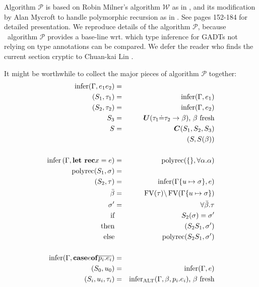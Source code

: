 \documentclass{article}
\newcommand{\tmmathbf}[1]{\ensuremath{\boldsymbol{#1}}}
\newcommand{\tmop}[1]{\ensuremath{\operatorname{#1}}}
\newcommand{\tmstrong}[1]{\textbf{#1}}
\begin{document}
Algorithm $\mathcal{P}$ is based on Robin Milner's algorithm $\mathcal{W}$ as
in {\cite{Milner78}}, and its modification by Alan Mycroft to handle
polymorphic recursion as in {\cite{Mycroft84}}. See
{\cite{PracticalGADTsInfer}} pages 152-184 for detailed presentation. We
reproduce details of the algorithm $\mathcal{P}$, because \ algorithm
$\mathcal{P}$ provides a base-line wrt. which type inference for GADTs not
relying on type annotations can be compared. We defer the reader who finds the
current section cryptic to Chuan-kai Lin {\cite{PracticalGADTsInfer}}.

It might be worthwhile to collect the major pieces of algorithm $\mathcal{P}$
together:
\begin{eqnarray*}
  \tmop{infer} (\Gamma, e_1 e_2) & = & \\
  (S_1, \tau_1) & = & \tmop{infer} (\Gamma, e_1)\\
  (S_2, \tau_2) & = & \tmop{infer} (\Gamma, e_2)\\
  S_3 & = & \tmmathbf{U} (\tau_1 \dot{=} \tau_2 \rightarrow \beta) \text{, }
  \beta \text{ fresh}\\
  S & = & \tmmathbf{C} (S_1, S_2, S_3)\\
  &  & (S, S (\beta))\\
  &  & \\
  \tmop{infer} \left( \Gamma, \text{{\tmstrong{let rec}}} x = e \right) & = &
  \tmop{polyrec} (\{ \}, \forall \alpha . \alpha)\\
  \tmop{polyrec} (S_1, \sigma) & = & \\
  (S_2, \tau) & = & \tmop{infer} (\Gamma \{ u \mapsto \sigma \}, e)\\
  \bar{\beta} & = & \tmop{FV} (\tau) \backslash \tmop{FV} (\Gamma \{ u \mapsto
  \sigma \})\\
  \sigma^{\prime} & = & \forall \bar{\beta} . \tau\\
  \text{if} &  & S_2 (\sigma) = \sigma^{\prime}\\
  \text{then} &  & (S_2 S_1, \sigma^{\prime})\\
  \text{else} &  & \tmop{polyrec} (S_2 S_1, \sigma^{\prime})\\
  &  & \\
  \tmop{infer} (\Gamma, \tmmathbf{\tmop{case}} e \tmmathbf{\tmop{of}} 
  \overline{p_i .e_i}) & = & \\
  (S_0, u_0) & = & \tmop{infer} (\Gamma, e)\\
  (S_i, u_i, \tau_i) & = & \tmop{infer}_{\tmop{ALT}} (\Gamma, \beta, p_i .e_i)
  \text{, } \beta \text{ fresh}\\

\end{eqnarray*}
\end{document}
